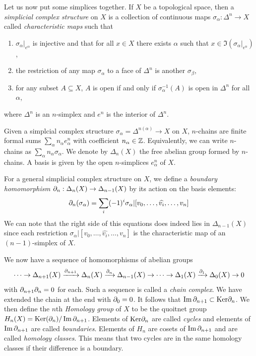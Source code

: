         Let us now put some simplices together. If $X$ be a topological space, then a \emph{simplicial complex structure} on $X$ is a collection of continuous maps $\sigma_\alpha:\Delta^n\to X$ called \emph{characteristic maps} such that
        \begin{enumerate}[label=\roman*)]
            \item $\sigma_\alpha|_{e^\alpha}$ is injective and that for all $x\in X$ there exists $\alpha$ such that $x\in\Im(\sigma_\alpha|_{e^n})$,
            \item the restriction of any map $\sigma_\alpha$ to a face of $\Delta^n$ is another $\sigma_\beta$,
            \item for any subset $A\subseteq X$, $A$ is open if and only if $\sigma^{-1}_{\alpha}(A)$ is open in $\Delta^n$ for all $\alpha$,
        \end{enumerate}
        where $\Delta^n$ is an $n$-simplex and $e^n$ is the interior of $\Delta^n$. 

        Given a simplcial complex structure $\sigma_\alpha=\Delta^{n(\alpha)}\to X$ on $X$, $n$-chains are finite formal sums $\sum_\alpha n_\alpha e^n_\alpha$ with coefficient $n_\alpha\in\mathbb{Z}$. Equivalently, we can write $n$-chains as $\sum_\alpha n_\alpha \sigma_\alpha$. We denote by $\Delta_n(X)$ the free abelian group formed by $n$-chains. A basis is given by the open $n$-simplices $e^n_\alpha$ of $X$.

        For a general simplicial complex structure on $X$, we define a \emph{boundary homomorphism} $\partial_n:\Delta_n(X)\to\Delta_{n-1}(X)$ by its action on the basis elements:
        \begin{equation}
            \partial_n(\sigma_\alpha)=\sum_i(-1)^i\sigma_\alpha|[v_0,\dots,\widehat{v_i},\dots,v_n]
        \end{equation}
        We can note that the right side of this equations does indeed lies in $\Delta_{n-1}(X)$ since each restriction $\sigma_\alpha|[v_0,\dots,\hat{v_i},\dots,v_n]$ is the characteristic map of an $(n-1)$-simplex of $X$.

        We now have a sequence of homomorphisms of abelian groups
        \begin{equation}
            \dots\to \Delta_{n+1}(X)\xrightarrow[]{\partial_{n+1}}\Delta_n(X)\xrightarrow[]{\partial_{n}}\Delta_{n-1}(X)\to\dots\to\Delta_1(X)\xrightarrow[]{\partial_{1}}\Delta_0(X)\to 0
        \end{equation}
        with $\partial_{n+1}\partial_n=0$ for each. Such a sequence is called a \emph{chain complex}. We have extended the chain at the end with $\partial_0=0$. It follows that $\Im\partial_{n+1}\subset\text{Ker}\partial_n$. We then define the $n$th \emph{Homology group} of $X$ to be the quoitnet group $H_n(X)=\text{Ker}(\partial_n)/\Im\partial_{n+1}$. Elements of $\text{Ker}\partial_n$ are called \emph{cycles} and elements of $\Im\partial_{n+1}$ are called \emph{boundaries}. Elements of $H_n$ are cosets of $\Im\partial_{n+1}$ and are called \emph{homology classes}. This means that two cycles are in the same homology classes if their difference is a boundary.

